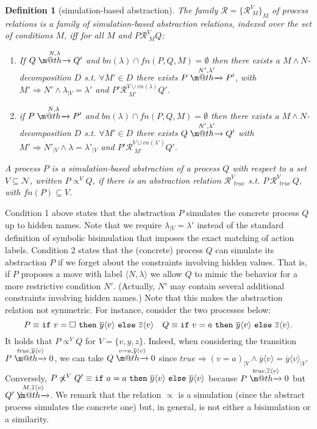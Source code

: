 \documentclass[submission,copyright,creativecommons]{eptcs}
\makeatletter
\newcommand{\opaque}{\square}
\newcommand{\outp}[2]{\overline{#1}\langle{#2}\rangle}
\newcommand{\ifte}[3]{{\tt if}\ #1\ {\tt then }\ #2\ {\tt else }\ #3}
\newcommand{\fn}{\mathit{fn}}
\newcommand{\bn}{\mathit{bn}}
\newcommand{\vn}{\mathit{vn}}
\newcommand{\act}{\lambda}
\newcommand{\tr}[1]{\stackrel{#1}{\rightarrowfill}}
\newcommand{\true}{\mathit{true}}
\def \rightarrowfill{\m@th\mathord{\smash-}\mkern-6mu\cleaders\hbox{$\mkern-2mu\mathord{\smash-}\mkern-2mu$}\hfill
  \mkern-6mu\mathord\rightarrow}
\newtheorem{definition1}{Definition}
\makeatother
\begin{document}
\begin{definition1}[simulation-based abstraction]\label{def:abstraction}
 The family $\mathcal{R}= \{\mathcal{R}^{V}_{\;M}\}_M$ of process 
 relations is a {\em family of simulation-based abstraction relations},
 indexed over the set of conditions $M$, iff for all $M$ and 
 $P \mathcal{R}^{V}_{\;M} Q$:  
 \begin{enumerate}
 \item If $Q \tr {N, \act} Q'$ and $\bn(\act)\cap\fn(P,Q,M) =\emptyset$
   then there exists a $M\wedge N$-decomposition $D$ s.t. $\forall 
   M'\in D$ there exists $P \tr {N',\act'} P'$, with
   $M'\Rightarrow N' \wedge \act_{|V} = \act'$ 
   and $P' \mathcal{R}^{V \cup \vn(\act) }_{\;M'} Q'$.
 \item if $P \tr {N, \act} P'$ and $\bn(\act)\cap\fn(P,Q,M) =\emptyset$
   then there exists a $M\wedge N$-decomposition $D$ s.t. $\forall 
   M'\in D$ there exists $Q \tr {N',\act'} Q'$ with $M'\Rightarrow 
   N'_{|V} \wedge \act = \act'_{|V}$ 
   and $P' \mathcal{R}^{V \cup \vn(\act') }_{\;M'} Q'.$  
 \end{enumerate}
 A process $P$ is a {\em simulation-based abstraction} of a process
 $Q$ with respect to a set $V \subseteq \mathcal{N}$, written $P
 \propto^V Q$, if there is an abstraction relation
 $\mathcal{R}^{V}_{\;\,\true}$ s.t. $P \, \mathcal{R}^{V}_{\;\,\true}
 \,Q$, with $\fn(P) \subseteq V$.
\end{definition1}
Condition 1 above states that the abstraction $P$ simulates the
concrete process $Q$ up to hidden names. Note that we require 
$\act_{|V} = \act'$ instead of the standard definition of symbolic 
bisimulation that imposes the exact matching of action labels.  
Condition 2 states that the (concrete) process $Q$ can simulate its abstraction 
$P$ if we forget about the constraints involving hidden values. 
That is, if $P$ proposes a
move with label $\langle N, \act \rangle$ we allow $Q$ to mimic the
behavior for a more restrictive condition $N'$. (Actually, $N'$ 
may contain several additional constraints involving hidden names.) 
Note that this makes the abstraction relation not symmetric.
For instance, consider the two processes below:
 \[
   P \equiv \ifte {v=\opaque} {\outp y v} {\outp z v} \quad 
   Q \equiv \ifte {v=a} {\outp y v} {\outp z v}. 
 \]
 It holds that $P\propto^V Q$ for $V = \{v,y,z\}$. Indeed, when
 considering the transition $P \tr {\true,\outp y v} 0$, we can take
 $Q \tr {v=a,\outp y v} 0$ since $\true \Rightarrow (v=a)_{|V} \wedge
 \outp y v = \outp y v_{|V}$.  Conversely, $P\not\propto^V Q'	
 \equiv \ifte {a=a} {\outp y v} {\outp y v}$ because $P
 \tr {\true,\outp z v} 0$ but $Q' \not\tr {M,\outp z v}$. 
  We remark that the relation $\propto$ is a simulation (since the abstract
 process simulates the concrete one) but, in general, is not either 
 a bisimulation or a similarity. 
\end{document}
